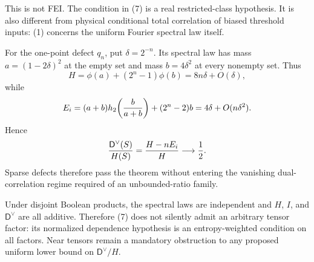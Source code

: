 This is not FEI.  The condition in (7) is a real restricted-class
hypothesis.  It is also different from physical conditional total
correlation of biased threshold inputs: (1) concerns the uniform Fourier
spectral law itself.

For the one-point defect $q_n$, put $\delta=2^{-n}$.  Its spectral law has
mass $a=(1-2\delta)^2$ at the empty set and mass $b=4\delta^2$ at every
nonempty set.  Thus
\[
 H=\phi(a)+(2^n-1)\phi(b)=8n\delta+O(\delta),
\]
while
\[
 E_i=(a+b)h_2\!\left({b\over a+b}\right)+(2^n-2)b
     =4\delta+O(n\delta^2).
\]
Hence
\[
 {\mathsf D^\vee(S)\over H(S)}
 ={H-nE_i\over H}\longrightarrow\frac12.
\]
Sparse defects therefore pass the theorem without entering the vanishing
dual-correlation regime required of an unbounded-ratio family.

Under disjoint Boolean products, the spectral laws are independent and
$H$, $I$, and $\mathsf D^\vee$ are all additive.  Therefore (7) does not
silently admit an arbitrary tensor factor: its normalized dependence
hypothesis is an entropy-weighted condition on all factors.  Near tensors
remain a mandatory obstruction to any proposed uniform lower bound on
$\mathsf D^\vee/H$.

